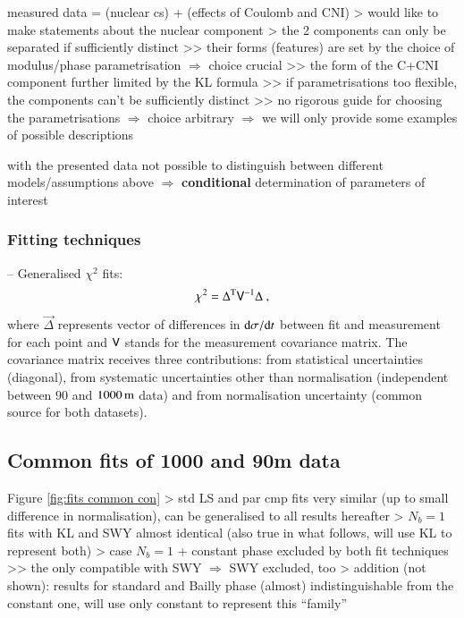 \> measured data = (nuclear cs) + (effects of Coulomb and CNI)
\>> would like to make statements about the nuclear component
\>> the 2 components can only be separated if sufficiently distinct
\>>> their forms (features) are set by the choice of modulus/phase parametrisation $\Rightarrow$ choice crucial
\>>> the form of the C+CNI component further limited by the KL formula
\>>> if parametrisations too flexible, the components can't be sufficiently distinct
\>>> no rigorous guide for choosing the parametrisations $\Rightarrow$ choice arbitrary $\Rightarrow$ we will only provide some examples of possible descriptions

\> with the presented data not possible to distinguish between different models/assumptions above $\Rightarrow$ {\bf conditional} determination of parameters of interest

\subsubsection{Fitting techniques}

\>  -- Generalised $\chi^2$ fits:
\begin{equation}
\label{eq:chi sq}
	\chi^2 = \Delta^{\rm T} \mathsf{V}^{-1} \Delta\ ,
\end{equation}
where $\vec\Delta$ represents vector of differences in ${\rm d}\sigma/{\rm d} t$ between fit and measurement for each point and $\mathsf{V}$ stands for the measurement covariance matrix. The covariance matrix receives three contributions: from statistical uncertainties (diagonal), from systematic uncertainties other than normalisation (independent between $90$ and $1000\,{\rm m}$ data) and from normalisation uncertainty (common source for both datasets).

\> 



\subsection{Common fits of 1000 and 90m data}

\> Figure \ref{fig:fits common con}
\>> std LS and par cmp fits very similar (up to small difference in normalisation), can be generalised to all results hereafter
\>> $N_b = 1$ fits with KL and SWY almost identical (also true in what follows, will use KL to represent both)
\>> case $N_b = 1$ + constant phase excluded by both fit techniques
\>>> the only compatible with SWY $\Rightarrow$ SWY excluded, too
\>> addition (not shown): results for standard and Bailly phase (almost) indistinguishable from the constant one, will use only constant to represent this ``family''


